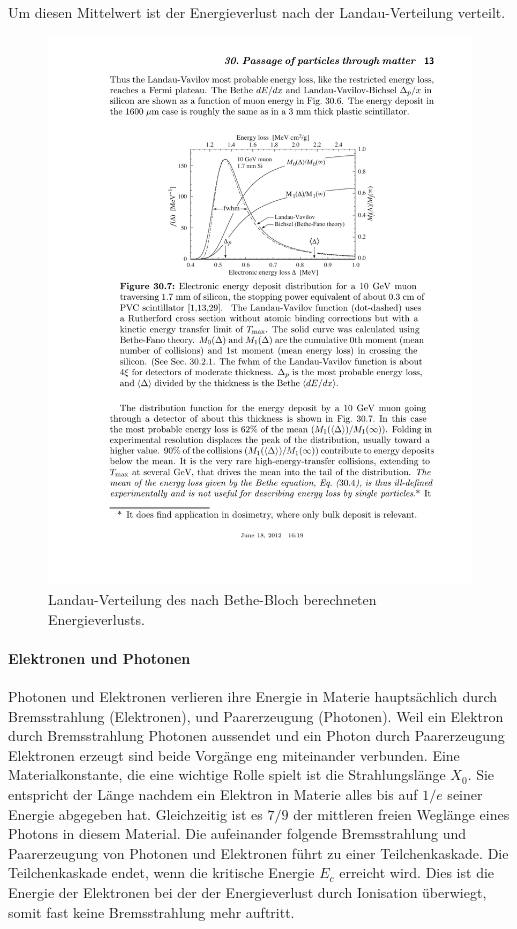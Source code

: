 Um diesen Mittelwert ist der Energieverlust nach der Landau-Verteilung verteilt.
\begin{figure}
\centering
\includegraphics[]{./input/landau.pdf}\caption{Landau-Verteilung des nach Bethe-Bloch berechneten Energieverlusts.\cite{Passage_through_matter}}\label{fig:landau}
\end{figure}
\paragraph{Elektronen und Photonen}\label{sec:emschauer}
Photonen und Elektronen verlieren ihre Energie in Materie hauptsächlich durch Bremsstrahlung (Elektronen), und Paarerzeugung (Photonen). Weil ein Elektron durch Bremsstrahlung Photonen aussendet und ein Photon durch Paarerzeugung Elektronen erzeugt sind beide Vorgänge eng miteinander verbunden. Eine Materialkonstante, die eine wichtige Rolle spielt ist die Strahlungslänge $X_0$. Sie entspricht der Länge nachdem ein Elektron in Materie alles bis auf $1/e$ seiner Energie abgegeben hat\cite{Passage_through_matter}. Gleichzeitig ist es $7/9$ der mittleren freien Weglänge eines Photons in diesem Material. Die aufeinander folgende Bremsstrahlung und Paarerzeugung von Photonen und Elektronen führt zu einer Teilchenkaskade. Die Teilchenkaskade endet, wenn die kritische Energie $E_c$ erreicht wird. Dies ist die Energie der Elektronen bei der der Energieverlust durch Ionisation überwiegt, somit fast keine Bremsstrahlung mehr auftritt.

